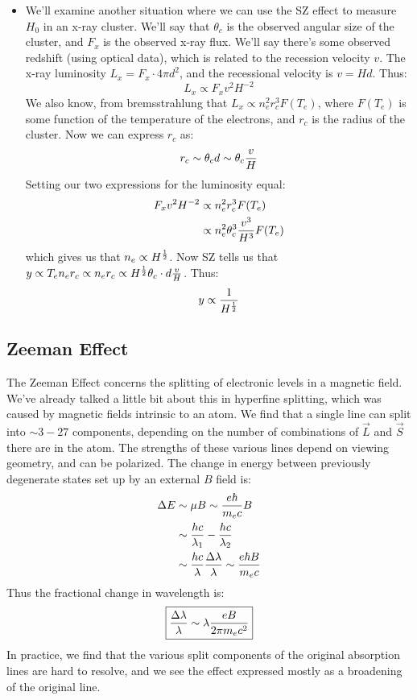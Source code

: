 \documentclass[11pt]{article}
\def\hf{{1 \over 2}}
\def\inv#1{{1 \over #1}}
\begin{document}
\begin{itemize}
\item We'll examine another situation where we can use the SZ effect
to measure $H_0$ in an x-ray cluster.  We'll say that $\theta_c$ is the 
observed angular size of the cluster, and $F_x$ is the observed x-ray flux.
We'll say there's some observed redshift (using optical data), which is 
related to the recession velocity $v$.  The x-ray luminosity $L_x=
F_x\cdot4\pi d^2$, and the recessional velocity is $v=Hd$.  Thus:
$$L_x\propto F_xv^2H^{-2}$$
We also know, from bremsstrahlung that $L_x\propto n_e^2r_c^3F(T_e)$, where
$F(T_e)$ is some function of the temperature of the electrons, and $r_c$ is 
the radius of the cluster.  Now we can express $r_c$ as:
$$r_c\sim\theta_cd\sim\theta_c{v\over H}$$
Setting our two expressions for the luminosity equal:
$$\begin{aligned}F_xv^2H^{-2}&\propto n_e^2r_c^3F(T_e)\\ 
&\propto n_e^2\theta_c^3{v^3\over H^3}F(T_e)\\ \end{aligned}$$
which gives us that $n_e\propto H^\hf$.  Now SZ tells us that $y\propto T_en_e
r_c\propto n_er_c\propto H^\hf\theta_c\cdot d{v\over H}$.  Thus:
$$y\propto \inv{H^\hf}$$
\end{itemize}

\subsection*{ Zeeman Effect}

The Zeeman Effect concerns the splitting of electronic levels in a magnetic
field.  We've already talked a little bit about this in hyperfine 
splitting, which was caused by magnetic fields intrinsic to an atom.  We find
that a single line can split into $\sim3-27$ components, depending on the 
number of combinations of $\vec L$ and $\vec S$ there are in the atom.  The
strengths of these various lines depend on viewing geometry, and can be
polarized.  The change in energy between previously degenerate states set up
by an external $B$ field is:
$$\begin{aligned}\Delta E&\sim\mu B\sim{e\hbar\over m_ec}B\\ 
&\sim{hc\over\lambda_1}-{hc\over\lambda_2}\\ 
&\sim{hc\over\lambda}{\Delta\lambda\over\lambda}\sim{e\hbar B\over m_ec}\\ \end{aligned}$$
Thus the fractional change in wavelength is:
$$\boxed{{\Delta\lambda\over\lambda}\sim\lambda{eB\over2\pi m_ec^2}}$$
In practice, we find that the various split components of the original
absorption lines are hard to resolve, and we see the effect expressed mostly
as a broadening of the original line.
\end{document}
